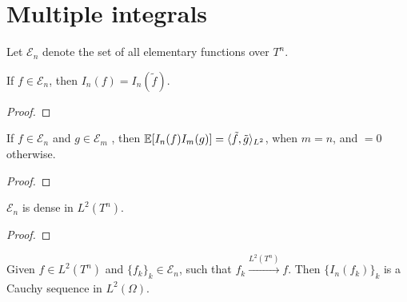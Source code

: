 \chapter{Multiple integrals}

\begin{definition}
    
\end{definition}

\begin{notation}
    Let $\mathcal{E}_n$ denote the set of all  elementary functions over $T^n$. 
\end{notation}

\begin{definition}
    
\end{definition}

\begin{definition}
    
\end{definition}

\begin{proposition}
    If $f \in \mathcal{E}_n$, then $I_n(f) = I_n(\tilde{f})$. 
\end{proposition}

\begin{proof}
    
\end{proof}

\begin{proposition}
    If $f \in \mathcal{E}_n$ and $g \in \mathcal{E}_m$
    , then $\operatorname{\mathbb{E}}[I_n(f) I_m(g)] = \langle \tilde{f}, \tilde{g} \rangle_{L^2}$, 
    when $m=n$, and $=0$ otherwise. 
\end{proposition}

\begin{proof}
    
\end{proof}

\begin{theorem}
    $\mathcal{E}_n$ is dense in $L^2(T^n)$. 
\end{theorem}

\begin{proof}
    
\end{proof}

\begin{proposition}
    \label{proposition:cauchy sequence in L^2}
    Given $f \in L^2(T^n)$ and $\{f_k\}_{k} \in \mathcal{E}_n$, 
    such that $f_k \xrightarrow[]{L^2(T^n)} f$. 
    Then $\{I_n(f_k)\}_k$ is a Cauchy sequence in $L^2(\Omega)$.  
\end{proposition}

